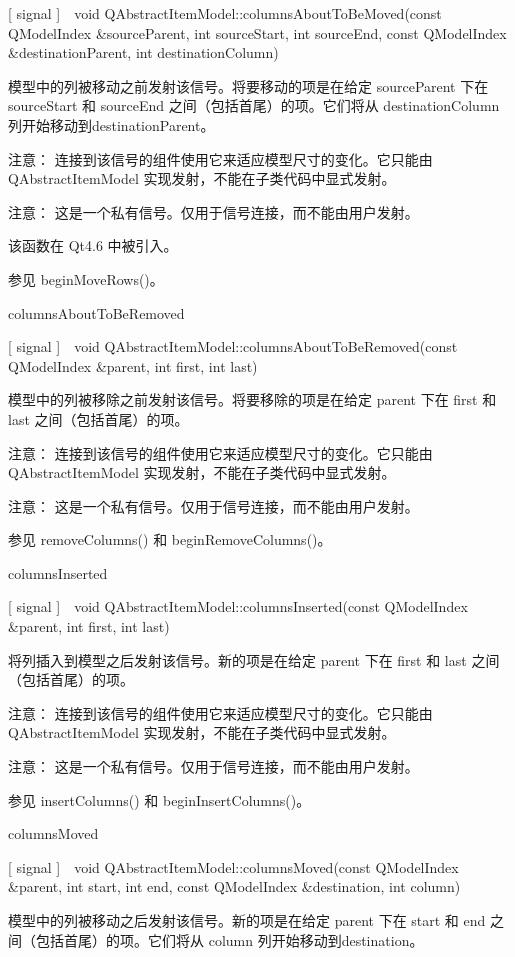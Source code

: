 [ signal ] void QAbstractItemModel::columnsAboutToBeMoved(const QModelIndex \&sourceParent, int sourceStart, int sourceEnd, const QModelIndex \&destinationParent, int destinationColumn)

模型中的列被移动之前发射该信号。将要移动的项是在给定 sourceParent 下在 sourceStart 和 sourceEnd 之间（包括首尾）的项。它们将从 destinationColumn 列开始移动到destinationParent。

注意： 连接到该信号的组件使用它来适应模型尺寸的变化。它只能由 QAbstractItemModel 实现发射，不能在子类代码中显式发射。

注意： 这是一个私有信号。仅用于信号连接，而不能由用户发射。

该函数在 Qt4.6 中被引入。

参见 beginMoveRows()。

columnsAboutToBeRemoved

[ signal ] void QAbstractItemModel::columnsAboutToBeRemoved(const QModelIndex \&parent, int first, int last)

模型中的列被移除之前发射该信号。将要移除的项是在给定 parent 下在 first 和 last 之间（包括首尾）的项。

注意： 连接到该信号的组件使用它来适应模型尺寸的变化。它只能由 QAbstractItemModel 实现发射，不能在子类代码中显式发射。

注意： 这是一个私有信号。仅用于信号连接，而不能由用户发射。

参见 removeColumns() 和 beginRemoveColumns()。

columnsInserted

[ signal ] void QAbstractItemModel::columnsInserted(const QModelIndex \&parent, int first, int last)

将列插入到模型之后发射该信号。新的项是在给定 parent 下在 first 和 last 之间（包括首尾）的项。

注意： 连接到该信号的组件使用它来适应模型尺寸的变化。它只能由 QAbstractItemModel 实现发射，不能在子类代码中显式发射。

注意： 这是一个私有信号。仅用于信号连接，而不能由用户发射。

参见 insertColumns() 和 beginInsertColumns()。

columnsMoved

[ signal ] void QAbstractItemModel::columnsMoved(const QModelIndex \&parent, int start, int end, const QModelIndex \&destination, int column)

模型中的列被移动之后发射该信号。新的项是在给定 parent 下在 start 和 end 之间（包括首尾）的项。它们将从 column 列开始移动到destination。

